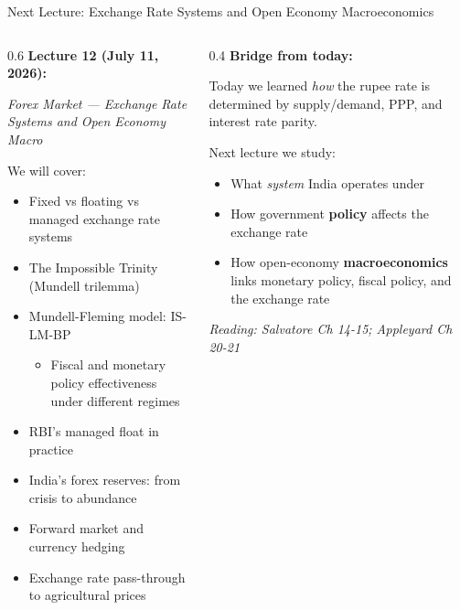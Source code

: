 \documentclass[
  ignorenonframetext,
  aspectratio=169,
]{beamer}
\makeatletter
\providecommand{\tightlist}{%
  \setlength{\itemsep}{0pt}\setlength{\parskip}{0pt}}
\let\quarto@originallabel\label
\DeclareRobustCommand*{\label}[1]{\quarto@originallabel{#1}}
\makeatother
\begin{document}
\begin{frame}{Next Lecture: Exchange Rate Systems and Open Economy
Macroeconomics}
\label{next-lecture-exchange-rate-systems-and-open-economy-macroeconomics}
\begin{columns}[T]
\begin{column}{0.6\linewidth}
\textbf{Lecture 12 (July 11, 2026):}

\emph{Forex Market --- Exchange Rate Systems and Open Economy Macro}

We will cover:

\begin{itemize}
\tightlist
\item
  Fixed vs floating vs managed exchange rate systems
\item
  The Impossible Trinity (Mundell trilemma)
\item
  Mundell-Fleming model: IS-LM-BP

  \begin{itemize}
  \tightlist
  \item
    Fiscal and monetary policy effectiveness under different regimes
  \end{itemize}
\item
  RBI's managed float in practice
\item
  India's forex reserves: from crisis to abundance
\item
  Forward market and currency hedging
\item
  Exchange rate pass-through to agricultural prices
\end{itemize}
\end{column}

\begin{column}{0.4\linewidth}
\textbf{Bridge from today:}

Today we learned \emph{how} the rupee rate is determined by
supply/demand, PPP, and interest rate parity.

Next lecture we study:

\begin{itemize}
\tightlist
\item
  What \emph{system} India operates under
\item
  How government \textbf{policy} affects the exchange rate
\item
  How open-economy \textbf{macroeconomics} links monetary policy, fiscal
  policy, and the exchange rate
\end{itemize}

\emph{Reading: Salvatore Ch 14-15; Appleyard Ch 20-21}
\end{column}
\end{columns}
\end{frame}
\end{document}
